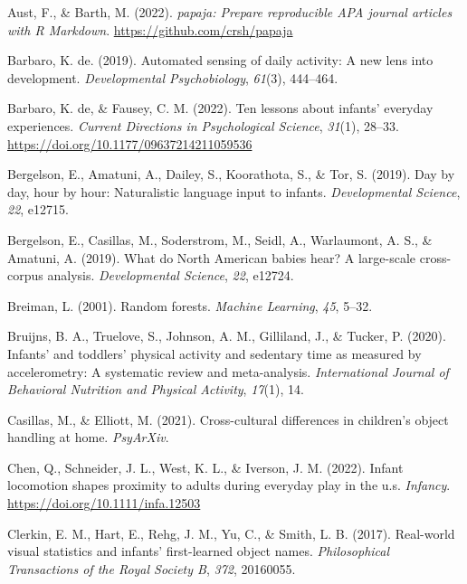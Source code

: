 \documentclass[
  man]{apa6}
\newlength{\cslhangindent}
\newlength{\cslentryspacingunit} %
\newenvironment{CSLReferences}[2] %
 {%
  \setlength{\parindent}{0pt}
  \ifodd #1
  \let\oldpar\par
  \def\par{\hangindent=\cslhangindent\oldpar}
  \fi
  \setlength{\parskip}{#2\cslentryspacingunit}
 }%
 {}
\begin{document}
\begin{CSLReferences}{1}{0}
\leavevmode{}%
Aust, F., \& Barth, M. (2022). \emph{{papaja: Prepare reproducible APA journal articles with R Markdown}}. \url{https://github.com/crsh/papaja}

\leavevmode{}%
Barbaro, K. de. (2019). Automated sensing of daily activity: A new lens into development. \emph{Developmental Psychobiology}, \emph{61}(3), 444--464.

\leavevmode{}%
Barbaro, K. de, \& Fausey, C. M. (2022). Ten lessons about infants' everyday experiences. \emph{Current Directions in Psychological Science}, \emph{31}(1), 28--33. \url{https://doi.org/10.1177/09637214211059536}

\leavevmode{}%
Bergelson, E., Amatuni, A., Dailey, S., Koorathota, S., \& Tor, S. (2019). Day by day, hour by hour: Naturalistic language input to infants. \emph{Developmental Science}, \emph{22}, e12715.

\leavevmode{}%
Bergelson, E., Casillas, M., Soderstrom, M., Seidl, A., Warlaumont, A. S., \& Amatuni, A. (2019). What do {N}orth {A}merican babies hear? {A} large-scale cross-corpus analysis. \emph{Developmental Science}, \emph{22}, e12724.

\leavevmode{}%
Breiman, L. (2001). Random forests. \emph{Machine Learning}, \emph{45}, 5--32.

\leavevmode{}%
Bruijns, B. A., Truelove, S., Johnson, A. M., Gilliland, J., \& Tucker, P. (2020). Infants' and toddlers' physical activity and sedentary time as measured by accelerometry: A systematic review and meta-analysis. \emph{International Journal of Behavioral Nutrition and Physical Activity}, \emph{17}(1), 14.

\leavevmode{}%
Casillas, M., \& Elliott, M. (2021). Cross-cultural differences in children's object handling at home. \emph{PsyArXiv}.

\leavevmode{}%
Chen, Q., Schneider, J. L., West, K. L., \& Iverson, J. M. (2022). Infant locomotion shapes proximity to adults during everyday play in the u.s. \emph{Infancy}. \url{https://doi.org/10.1111/infa.12503}

\leavevmode{}%
Clerkin, E. M., Hart, E., Rehg, J. M., Yu, C., \& Smith, L. B. (2017). Real-world visual statistics and infants' first-learned object names. \emph{Philosophical Transactions of the Royal Society B}, \emph{372}, 20160055.


\end{CSLReferences}
\end{document}
